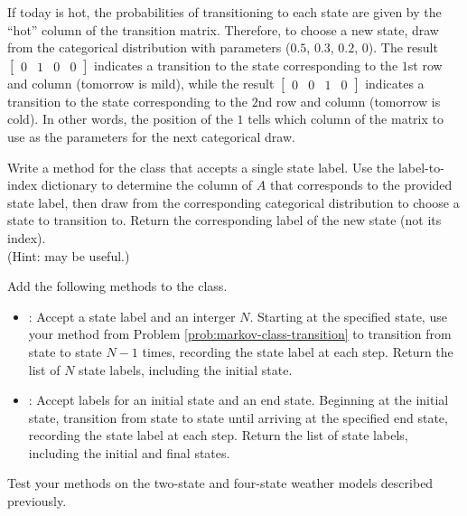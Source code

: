 If today is hot, the probabilities of transitioning to each state are given by the ``hot'' column of the transition matrix.
Therefore, to choose a new state, draw from the categorical distribution with parameters ($0.5$, $0.3$, $0.2$, $0$).
The result $\begin{bmatrix}0 & 1 & 0 & 0\end{bmatrix}$ indicates a transition to the state corresponding to the $1$st row and column (tomorrow is mild), while the result $\begin{bmatrix}0 & 0 & 1 & 0\end{bmatrix}$ indicates a transition to the state corresponding to the $2$nd row and column (tomorrow is cold).
In other words, the position of the $1$ tells which column of the matrix to use as the parameters for the next categorical draw.

\begin{problem} %
Write a method for the  class that accepts a single state label.
Use the label-to-index dictionary to determine the column of $A$ that corresponds to the provided state label, then draw from the corresponding categorical distribution to choose a state to transition to.
Return the corresponding label of the new state (not its index).
\\(Hint:  may be useful.)
\label{prob:markov-class-transition}
\end{problem}

\begin{problem} %
\label{prob:markov-class-walkers}
Add the following methods to the  class.
\begin{itemize}
\item {}: Accept a state label and an interger $N$.
Starting at the specified state, use your method from Problem \ref{prob:markov-class-transition} to transition from state to state $N-1$ times, recording the state label at each step.
Return the list of $N$ state labels, including the initial state.
\item {}: Accept labels for an initial state and an end state.
Beginning at the initial state, transition from state to state until arriving at the specified end state, recording the state label at each step.
Return the list of state labels, including the initial and final states.
\end{itemize}
Test your methods on the two-state and four-state weather models described previously.
\end{problem}

